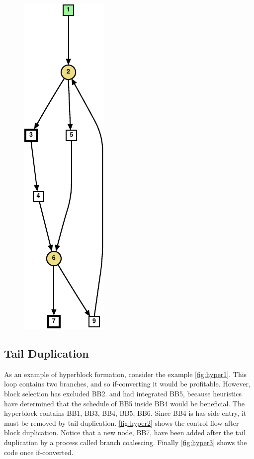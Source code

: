 \begin{figure}
{    \includegraphics[scale=0.6]{graph7}
    \label{fig:wc2}}
\label{fig:wc example}
\end{figure}

\subsection{Tail Duplication}

As an example of hyperblock formation, consider the example \ref{fig:hyper1}. This loop contains two branches, and so if-converting it would be profitable. However, block selection has excluded BB2. and had integrated BB5, because heuristics have determined that the schedule of BB5 inside BB4 would be beneficial. The hyperblock contains {BB1, BB3, BB4, BB5, BB6}. Since BB4 is has side entry, it must be removed by tail duplication. \ref{fig:hyper2} shows the  control flow after block duplication. Notice that a new node, BB7, have been added after the tail duplication by a process called branch coalescing. Finally \ref{fig:hyper3} shows the code once if-converted.

